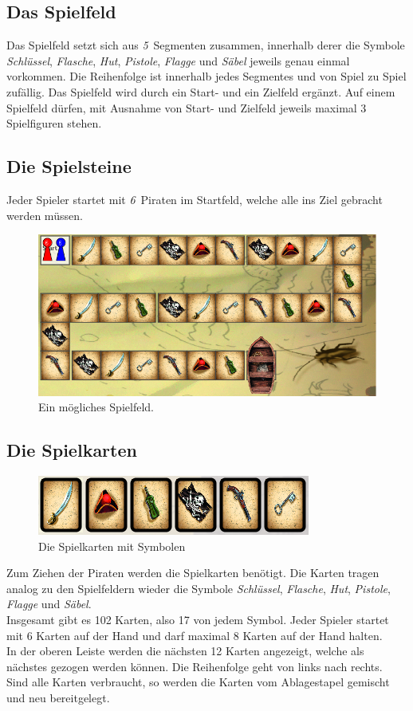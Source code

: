 \documentclass{scrartcl}
\newcommand{\SpielSegmenteAnzahl}{\emph{5}}
\newcommand{\PiratenAnzahl}{\emph{6}}
\begin{document}
	\subsection{Das Spielfeld}
	Das Spielfeld setzt sich aus \SpielSegmenteAnzahl\ Segmenten zusammen,
	innerhalb derer die Symbole \emph{Schlüssel}, \emph{Flasche}, \emph{Hut},
	\emph{Pistole}, \emph{Flagge} und \emph{Säbel} jeweils genau einmal vorkommen.
	Die Reihenfolge ist innerhalb jedes Segmentes und von Spiel zu Spiel zufällig.
	Das Spielfeld wird durch ein Start- und ein Zielfeld ergänzt.
	Auf einem Spielfeld dürfen, mit Ausnahme von Start- und Zielfeld jeweils
	maximal 3 Spielfiguren stehen.
	\subsection{Die Spielsteine}
	Jeder Spieler startet mit \PiratenAnzahl\ Piraten im Startfeld, welche alle ins
	Ziel gebracht werden müssen.
	\begin{figure}[h]
		\label{fig:Spielfeld}
		\centering
		\includegraphics[scale = 0.5]{bilder/Spielfeld}
		\caption{Ein mögliches Spielfeld.}
	\end{figure}
	
	\subsection{Die Spielkarten}
	
	\begin{figure}[h]
		\centering
		\includegraphics[scale = 0.5]{bilder/Karten}
		\caption{Die Spielkarten mit Symbolen}
	\end{figure}
	Zum Ziehen der Piraten werden die Spielkarten benötigt. Die Karten tragen
	analog zu den Spielfeldern wieder die Symbole \emph{Schlüssel}, \emph{Flasche}, \emph{Hut},
	\emph{Pistole}, \emph{Flagge} und \emph{Säbel}.\\
	Insgesamt gibt es 102 Karten, also 17 von jedem Symbol. Jeder Spieler startet
	mit 6 Karten auf der Hand und darf maximal 8 Karten auf der Hand halten.\\
	In der oberen Leiste werden die nächsten 12 Karten angezeigt, welche als
	nächstes gezogen werden können. Die Reihenfolge geht von links nach rechts.\\
	Sind alle Karten verbraucht, so werden die Karten vom Ablagestapel gemischt und
	neu bereitgelegt.
\end{document}
